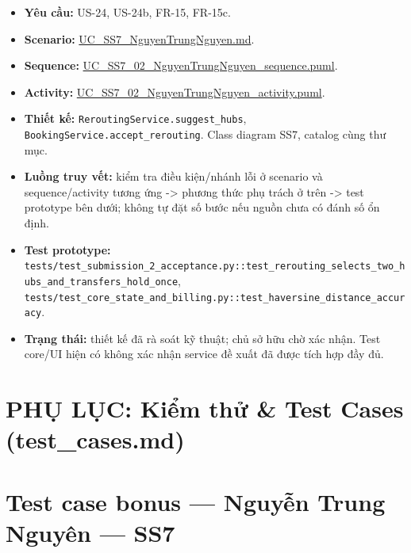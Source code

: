 \documentclass[11pt,a4paper]{article}
\providecommand{\tightlist}{%
  \setlength{\itemsep}{0pt}\setlength{\parskip}{0pt}}
\begin{document}
\begin{itemize}
\tightlist
\item
  \textbf{Yêu cầu:} US-24, US-24b, FR-15, FR-15c.
\item
  \textbf{Scenario:}
  \href{../../../../docs/diagrams/Use-case\%20detail-scenario/SS7/Usecase\%20scenario/UC_SS7_NguyenTrungNguyen.md}{UC\_SS7\_NguyenTrungNguyen.md}.
\item
  \textbf{Sequence:}
  \href{../../../../docs/diagrams/Use-case\%20detail-scenario/SS7/Sequence\%20diagrams/UC_SS7_02_NguyenTrungNguyen_sequence.puml}{UC\_SS7\_02\_NguyenTrungNguyen\_sequence.puml}.
\item
  \textbf{Activity:}
  \href{../../../../docs/diagrams/Use-case\%20detail-scenario/SS7/Activity\%20diagrams/UC_SS7_02_NguyenTrungNguyen_activity.puml}{UC\_SS7\_02\_NguyenTrungNguyen\_activity.puml}.
\item
  \textbf{Thiết kế:} \texttt{ReroutingService.suggest\_hubs},
  \texttt{BookingService.accept\_rerouting}. Class diagram SS7, catalog
  cùng thư mục.
\item
  \textbf{Luồng truy vết:} kiểm tra điều kiện/nhánh lỗi ở scenario và
  sequence/activity tương ứng -\textgreater{} phương thức phụ trách ở
  trên -\textgreater{} test prototype bên dưới; không tự đặt số bước nếu
  nguồn chưa có đánh số ổn định.
\item
  \textbf{Test prototype:}
  \texttt{tests/test\_submission\_2\_acceptance.py::test\_rerouting\_selects\_two\_hubs\_and\_transfers\_hold\_once},
  \texttt{tests/test\_core\_state\_and\_billing.py::test\_haversine\_distance\_accuracy}.
\item
  \textbf{Trạng thái:} thiết kế đã rà soát kỹ thuật; chủ sở hữu chờ xác
  nhận. Test core/UI hiện có không xác nhận service đề xuất đã được tích
  hợp đầy đủ.
\end{itemize}

\newpage
\section*{PHỤ LỤC: Kiểm thử \& Test Cases (test\_cases.md)}
\hypertarget{test-case-bonus-nguyux1ec5n-trung-nguyuxean-ss7}{%
\section{Test case bonus --- Nguyễn Trung Nguyên ---
SS7}\label{test-case-bonus-nguyux1ec5n-trung-nguyuxean-ss7}}
\end{document}
